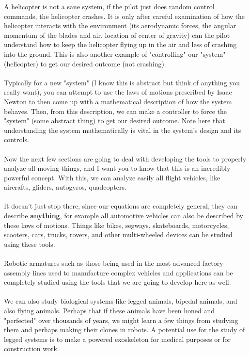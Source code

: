 A helicopter is not a sane system, if the pilot just does random control commands, the helicopter crashes. 
It is only after careful examination of how the helicopter interacts with the environment (its aerodynamic forces, the angular momentum of the blades and air, location of center of gravity) can the pilot understand how to keep the helicopter flying up in the air and less of crashing into the ground.
This is also another example of "controlling" our "system" (helicopter) to get our desired outcome (not crashing).
\\~\\Typically for a new "system" (I know this is abstract but think of anything you really want), you can attempt to use the laws of motions prescribed by Isaac Newton to then come up with a mathematical description of how the system behaves. 
Then, from this description, we can make a controller to force the "system" (some abstract thing) to get our desired outcome.
Note here that understanding the system mathematically is vital in the system's design and its controls.
\\~\\Now the next few sections are going to deal with developing the tools to properly analyze all moving things, and I want you to know that this is an incredibly powerful concept.
With this, we can analyze easily all flight vehicles, like aircrafts, gliders, autogyros, quadcopters.
\\~\\It doesn't just stop there, since our equations are completely general, they can describe \textbf{anything}, for example all automotive vehicles can also be described by these laws of motions.
Things like bikes, segways, skateboards, motorcycles, scooters, cars, trucks, rovers, and other multi-wheeled devices can be studied using these tools.
\\~\\Robotic armatures such as those being used in the most advanced factory assembly lines used to manufacture complex vehicles and applications can be completely studied using the tools that we are going to develop here as well. 
\\~\\We can also study biological systems like legged animals, bipedal animals, and also flying animals.
Perhaps that if these animals have been honed and "perfected" over thousands of years, we might learn a few things from studying them and perhaps making their clones in robots. 
A potential use for the study of legged systems is to make a powered exoskeleton for medical purposes or for construction work.

